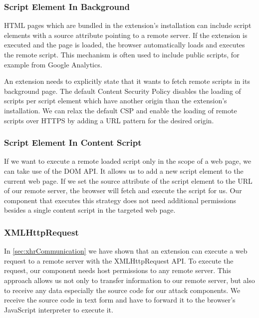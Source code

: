 \subsubsection{Script Element In Background}
\label{sec:scriptElementInBackground}
	
	HTML pages which are bundled in the extension's installation can include script elements with a source attribute pointing to a remote server. If the extension is executed and the page is loaded, the browser automatically loads and executes the remote script. This mechanism is often used to include public scripts, for example from Google Analytics. 
	
	An extension needs to explicitly state that it wants to fetch remote scripts in its background page. The default Content Security Policy disables the loading of scripts per script element which have another origin than the extension's installation. We can relax the default CSP and enable the loading of remote scripts over HTTPS by adding a URL pattern for the desired origin. 
	
\subsubsection{Script Element In Content Script}
\label{sec:scriptElementInContentScript}

	If we want to execute a remote loaded script only in the scope of a web page, we can take use of the DOM API. It allows us to add a new script element to the current web page. If we set the source attribute of the script element to the URL of our remote server, the browser will fetch and execute the script for us. Our component that executes this strategy does not need additional permissions besides a single content script in the targeted web page. 
	
\subsubsection{XMLHttpRequest}
\label{sec:xhrFetching}

	In \autoref{sec:xhrCommunication} we have shown that an extension can execute a web request to a remote server with the XMLHttpRequest API. To execute the request, our component needs host permissions to any remote server. This approach allows us not only to transfer information to our remote server, but also to receive any data especially the source code for our attack components. We receive the source code in text form and have to forward it to the browser's JavaScript interpreter to execute it.
	
